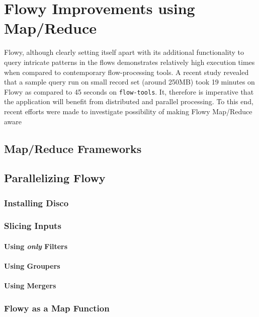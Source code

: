 \chapter{Flowy Improvements using Map/Reduce}\label{ch:flowy-mapreduce}

Flowy, although clearly setting itself apart with its additional functionality to query intricate patterns in the flows demonstrates relatively high execution times when compared to contemporary flow-processing tools. A recent study \cite{pnemeth:thesis:2010} revealed that a sample query run on small record set (around 250MB) took 19 minutes on Flowy as compared to 45 seconds on \texttt{flow-tools}. It, therefore is imperative that the application will benefit from distributed and parallel processing. To this end, recent efforts were made to investigate possibility of making Flowy Map/Reduce aware \cite{pnemeth:thesis:2010}

\section{Map/Reduce Frameworks}\label{sec:map-reduce}
\section{Parallelizing Flowy}\label{sec:parallel-flowy}
	\subsection{Installing Disco}\label{subsec:install-disco}
	\subsection{Slicing Inputs}\label{subsec:slice-input}
		\subsubsection{Using \emph{only} Filters}\label{subsec:filters-only}
		\subsubsection{Using Groupers}\label{subsec:using-groupers}
		\subsubsection{Using Mergers}\label{subsec:using-mergers}
	\subsection{Flowy as a Map Function}\label{subsec:flowy-map}
